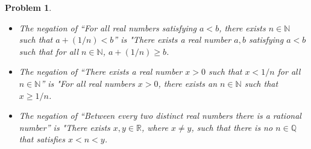 \documentclass[12pt]{article}
\newtheorem{problem}{Problem}
\newcommand{\QQ}{\ensuremath{\mathbb Q}}
\newcommand{\RR}{\ensuremath{\mathbb R}}
\newcommand{\NN}{\ensuremath{\mathbb N}}
\begin{document}
\begin{problem} %


\begin{itemize}
	\item[(a)] The negation of ``For all real numbers satisfying $a<b$, there exists $n\in\NN$ such that $a+(1/n)<b$'' is "There exists a real number $a,b$ satisfying $a<b$ such that for all $n \in \NN$, $a + (1/n) \geq b$.

\item[(b)] The negation of ``There exists a real number $x>0$ such that $x<1/n$ for all $n\in\NN$'' is "For all real numbers $x > 0$, there exists an $n \in \NN$ such that $x \geq 1/n$.

\item[(b)] The negation of ``Between every two distinct real numbers there is a rational number'' is "There exists $x,y \in \RR$, where $x \neq y$, such that there is no $n \in \QQ$ that satisfies $ x < n < y$.
\end{itemize}
\end{problem}
\end{document}

